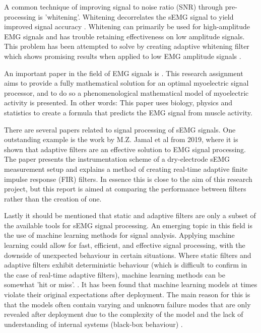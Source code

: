 A common technique of improving signal to noise ratio (SNR) through pre-processing is 'whitening'. Whitening decorrelates the sEMG signal to yield improved signal accuracy \cite{emg_whitening}. 
Whitening can primarily be used for high-amplitude EMG signals and has trouble retaining effectiveness on low amplitude signals. This problem has been attempted to solve by creating adaptive whitening filter which shows promising results when applied to low EMG amplitude signals \cite{adaptive_whitening}. 

An important paper in the field of EMG signals is \cite{optimal_myoprocessor}. This research assignment aims to provide a fully mathematical solution for an optimal myoelectric signal processor, and to do so a phenomenological mathematical model of myoelectric activity is presented. In other words: This paper uses biology, physics and statistics to create a formula that predicts the EMG signal from muscle activity.

There are several papers related to signal processing of sEMG signals.
One outstanding example is the work by M.Z. Jamal et al \cite{adaptive_filter_dry_electrode} from 2019, where it is shown that adaptive filters are an effective solution to EMG signal processing. The paper presents the instrumentation scheme of a dry-electrode sEMG measurement setup and explains a method of creating real-time adaptive finite impulse response (FIR) filters. In essence this is close to the aim of this research project, but this report is aimed at comparing the performance between filters rather than the creation of one.


Lastly it should be mentioned that static and adaptive filters are only a subset of the available tools for sEMG signal processing. An emerging topic in this field is the use of machine learning methods for signal analysis. Applying machine learning could allow for fast, efficient, and effective signal processing, with the downside of unexpected behaviour in certain situations. Where static filters and adaptive filters exhibit deterministic behaviour (which is difficult to confirm in the case of real-time adaptive filters), machine learning methods can be somewhat 'hit or miss'. \cite{ml_semg_processing_1,ml_semg_processing_2}. It has been found that machine learning models at times violate their original expectations after deployment. The main reason for this is that the models often contain varying and unknown failure modes that are only revealed after deployment due to the complexity of the model and the lack of understanding of internal systems (black-box behaviour) \cite{microsoft_machine_learning_reliable}.

